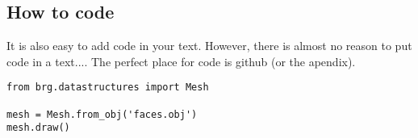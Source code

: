 \subsection{How to code}
It is also easy to add code in your text.
However, there is almost no reason to put code in a text....
The perfect place for code is github (or the apendix).
\lstset{language=Python}
\lstset{frame=lines}
\lstset{basicstyle=\footnotesize}
\begin{lstlisting}
from brg.datastructures import Mesh
     
mesh = Mesh.from_obj('faces.obj')
mesh.draw()
\end{lstlisting}

